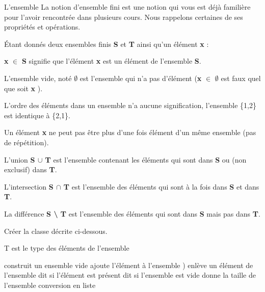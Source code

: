 \begin{Exercice}{L'ensemble}
		La notion d’ensemble fini est une notion qui vous est déjà 
		familière pour l’avoir rencontrée dans plusieurs cours. Nous rappelons
		certaines de ses propriétés et opérations. 
				
		Étant donnés deux ensembles
		finis \textbf{S} et \textbf{T} ainsi qu’un élément \textbf{x} :

		\begin{liste}
		\item 
			\textbf{x} {${\in}$} \textbf{S} signifie que l’élément \textbf{x}
			est un élément de l’ensemble \textbf{S}.
		\item 
			L’ensemble vide, noté \textbf{${\emptyset}$} 
			est l’ensemble qui n’a pas d’élément 
			(\textbf{x} {${\in}$} \textbf{${\emptyset}$} 
			est faux quel que soit \textbf{x} ).
		\item 
			L’ordre des éléments dans un ensemble n’a
			aucune signification, l’ensemble \{1,2\} est
			identique à \{2,1\}.
		\item 
			Un élément \textbf{x} ne peut
			pas être plus d’une fois élément d’un même ensemble 
			(pas de répétition).
		\item 
			L’union \textbf{S ${\cup}$ T} 
			est l’ensemble contenant les éléments qui sont dans 
			\textbf{S} ou (non exclusif) dans \textbf{T}.
		\item 
			L’intersection \textbf{S ${\cap}$ T} 
			est l’ensemble des éléments qui sont à la fois 
			dans \textbf{S} et dans \textbf{T}.
		\item 
			La différence \textbf{S {\textbackslash} T} 
			est l’ensemble des éléments qui sont 
			dans \textbf{S} mais pas dans \textbf{T}.
		\end{liste}
		
		Créer la classe 
		décrite ci-dessous.
		
		\begin{Pseudocode}
			\RComment T est le type des éléments de l'ensemble
			
				\Public
				\RComment construit un ensemble vide
				\RComment ajoute l'élément à l'ensemble
				)
				\RComment enlève un élément de l'ensemble
				\RComment dit si l'élément est présent
				\RComment dit si l'ensemble est vide
				\RComment donne la taille de l'ensemble
				\RComment conversion en liste
			\EndClass
		\end{Pseudocode}
		

\end{Exercice}
